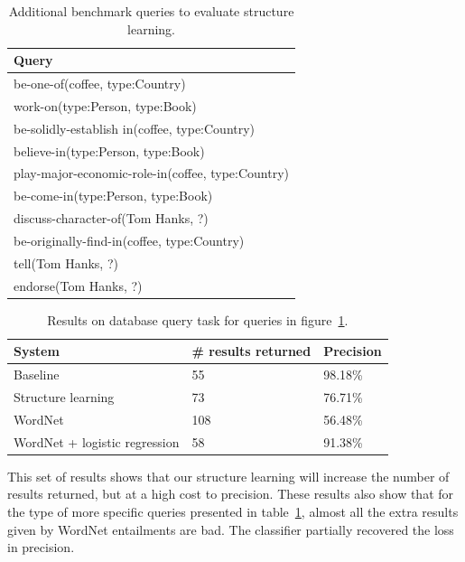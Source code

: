 \documentclass{article}
\begin{document}
\begin{table}[h]
  \caption{Additional benchmark queries to evaluate structure learning.}\label{structure-queries}
  \begin{center}
    \begin{tabular}{l}
      \toprule
      Query\\
      \midrule
      be-one-of(coffee, type:Country)\\
      work-on(type:Person, type:Book)\\
      be-solidly-establish in(coffee, type:Country)\\
      believe-in(type:Person, type:Book)\\
      play-major-economic-role-in(coffee, type:Country)\\
      be-come-in(type:Person, type:Book)\\
      discuss-character-of(Tom Hanks, ?)\\
      be-originally-find-in(coffee, type:Country)\\
      tell(Tom Hanks, ?)\\
      endorse(Tom Hanks, ?)\\
      \bottomrule
    \end{tabular}
  \end{center}
\end{table}

\begin{table}[h]
  \caption{Results on database query task for queries in figure~\ref{structure-queries}.}\label{structure-results}
  \begin{center}
    \begin{tabular}{l l l}
      \toprule
      System & \# results returned & Precision\\
      \midrule
      Baseline & 55 & 98.18\%\\
      Structure learning & 73 & 76.71\%\\
      WordNet & 108 & 56.48\% \\
      WordNet + logistic regression & 58 & 91.38\%\\
      \bottomrule
    \end{tabular}
  \end{center}
\end{table}

This set of results shows that our structure learning will increase the number of results returned, but at a high cost to precision. These results also show that for the type of more specific queries presented in table~\ref{structure-queries}, almost all the extra results given by WordNet entailments are bad. The classifier partially recovered the loss in precision.
\end{document}
